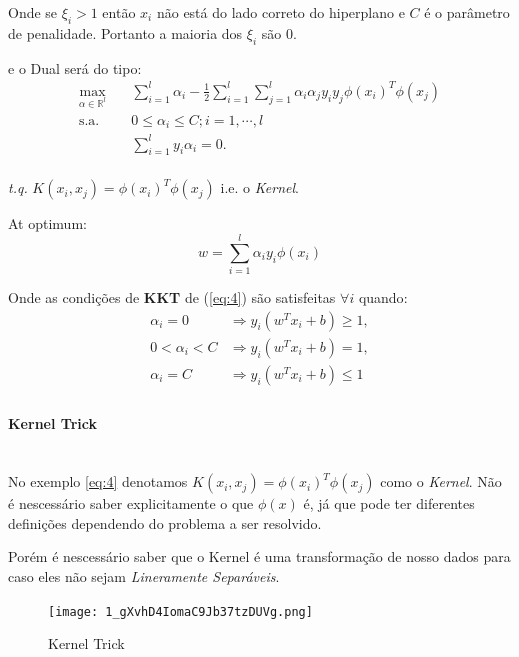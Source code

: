 \documentclass{article}
\begin{document}
Onde se \(\xi_i>1\) então \(x_i\) não está do lado correto do hiperplano e \(C\) é o parâmetro de penalidade. Portanto a maioria dos \(\xi_i\) são 0.

e o Dual será do tipo:
\begin{equation}\label{eq:4} %
\begin{aligned}
\max_{\alpha\in \mathbb{R}^l} \quad &\sum_{i=1}^{l}\alpha_i-\frac{1}{2}\sum_{i=1}^{l}\sum_{j=1}^{l}\alpha_i\alpha_j y_i y_j\phi(x_i)^T\phi(x_j)\\
\textrm{s.a.} \quad & 0\leq\alpha_i\leq C;i=1,\cdots,l\\
  &\sum_{i=1}^{l}y_i\alpha_i=0. \\
  \end{aligned}
\end{equation}

\textit{t.q.} \(K(x_i,x_j)=\phi(x_i)^T\phi(x_j)\) i.e. o \textit{Kernel}.

At optimum:
\[w = \sum_{i=1}^{l}\alpha_i y_i\phi(x_i)\]


Onde as condições de \textbf{KKT} de (\ref{eq:4}) são satisfeitas \(\forall i\) quando\cite{platt}:
\[\begin{aligned}\alpha_i = 0&\Rightarrow y_i (w^Tx_i+b)\geq1,\\
0<\alpha_i<C&\Rightarrow y_i(w^Tx_i+b)=1,\\
\alpha_i=C&\Rightarrow y_i (w^Tx_i+b)\leq1\\
\end{aligned}\]


\paragraph{Kernel Trick}\hspace{0pt}\\

No exemplo \ref{eq:4} denotamos \(K(x_i,x_j)=\phi(x_i)^T\phi(x_j)\) como o \textit{Kernel}. Não é nescessário saber explicitamente o que \(\phi(x)\) é, já que pode ter diferentes definições dependendo do problema a ser resolvido.

Porém é nescessário saber que o Kernel é uma transformação de nosso dados para caso eles não sejam \textit{Lineramente Separáveis}.

\begin{figure}[H]
    \centering
    \texttt{[image: 1\_gXvhD4IomaC9Jb37tzDUVg.png]}
    \caption{Kernel Trick}
    \label{fig:Kernel}
\end{figure}
\end{document}
